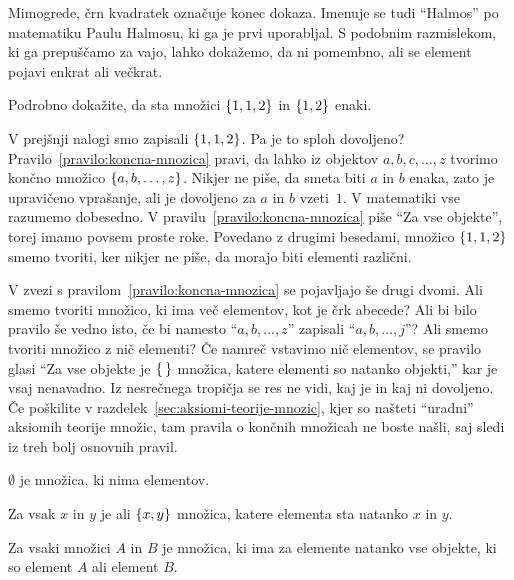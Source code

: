 Mimogrede, črn kvadratek označuje konec dokaza. Imenuje se tudi ``Halmos'' po matematiku
Paulu Halmosu, ki ga je prvi uporabljal. S podobnim razmislekom, ki ga prepuščamo za vajo,
lahko dokažemo, da ni pomembno, ali se element pojavi enkrat ali večkrat.

\begin{naloga}
  Podrobno dokažite, da sta množici $\set{1, 1, 2}$ in $\set{1, 2}$ enaki.
\end{naloga}

V prejšnji nalogi smo zapisali $\set{1, 1, 2}$. Pa je to sploh dovoljeno?
Pravilo~\ref{pravilo:koncna-mnozica} pravi, da lahko iz objektov $a, b, c, \ldots, z$
tvorimo končno množico $\set{a, b, \ldots, z}$. Nikjer ne piše, da smeta biti $a$ in $b$
enaka, zato je upravičeno vprašanje, ali je dovoljeno za $a$ in $b$ vzeti~$1$. V
matematiki vse razumemo dobesedno. V pravilu~\ref{pravilo:koncna-mnozica} piše ``Za vse
objekte'', torej imamo povsem proste roke. Povedano z drugimi besedami, množico
$\set{1, 1, 2}$ smemo tvoriti, ker nikjer ne piše, da morajo biti elementi različni.

V zvezi s pravilom~\ref{pravilo:koncna-mnozica} se pojavljajo še drugi dvomi. Ali smemo
tvoriti množico, ki ima več elementov, kot je črk abecede? Ali bi bilo pravilo še vedno
isto, če bi namesto ``$a, b, \ldots, z$'' zapisali ``$a, b, \ldots, j$''? Ali smemo
tvoriti množico z nič elementi? Če namreč vstavimo nič elementov, se pravilo glasi ``Za
vse objekte je $\set{\,}$ množica, katere elementi so natanko objekti,'' kar je vsaj
nenavadno. Iz nesrečnega tropičja se res ne vidi, kaj je in kaj ni dovoljeno. Če poškilite
v razdelek~\ref{sec:aksiomi-teorije-mnozic}, kjer so našteti ``uradni'' aksiomih teorije
množic, tam pravila o končnih množicah ne boste našli, saj sledi iz treh bolj osnovnih
pravil.

\begin{pravilo}
  \label{pravilo:prazna-mnozica}
   $\emptyset$ je množica, ki nima elementov.
\end{pravilo}

\begin{pravilo}
  \label{pravilo:neurejeni-dvojec}
  Za vsak $x$ in $y$ je  ali  $\set{x, y}$ množica, katere
  elementa sta natanko $x$ in $y$.
\end{pravilo}

\begin{pravilo}
  \label{pravilo:unija}
  Za vsaki množici $A$ in $B$ je  množica, ki ima za elemente
  natanko vse objekte, ki so element $A$ ali element $B$.
\end{pravilo}

